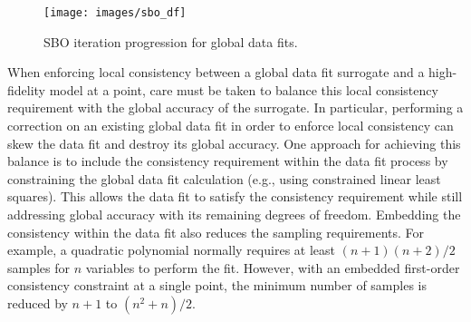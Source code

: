 \begin{wrapfigure}{r}{.3\textwidth}
  \centering
  \texttt{[image: images/sbo\_df]}
  \caption{SBO iteration progression for global data fits.}
  \label{fig:sbo_df}
\end{wrapfigure}
When enforcing local consistency between a global data fit surrogate
and a high-fidelity model at a point, care must be taken to balance
this local consistency requirement with the global accuracy of the
surrogate.  In particular, performing a correction on an existing
global data fit in order to enforce local consistency can skew the
data fit and destroy its global accuracy.  One approach for achieving
this balance is to include the consistency requirement within the data
fit process by constraining the global data fit calculation (e.g.,
using constrained linear least squares).  This allows the data fit to
satisfy the consistency requirement while still addressing global
accuracy with its remaining degrees of freedom.
Embedding the consistency within the data fit also reduces the
sampling requirements.  For example, a quadratic polynomial normally
requires at least $(n+1)(n+2)/2$ samples for $n$ variables to perform
the fit.  However, with an embedded first-order consistency constraint
at a single point, the minimum number of samples is reduced by $n+1$ 
to $(n^2+n)/2$.



